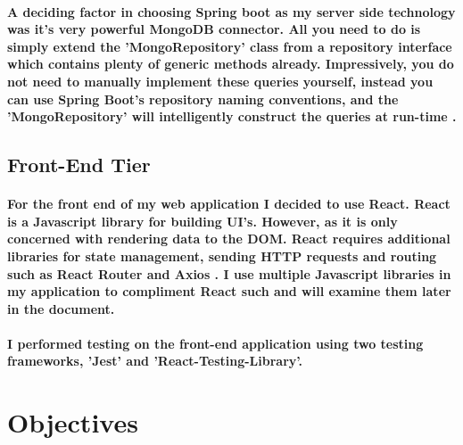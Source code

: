 \paragraph{A deciding factor in choosing Spring boot as my server side technology was it's very powerful MongoDB connector. All you need to do is simply extend the 'MongoRepository' class from a repository interface which contains plenty of generic methods already. Impressively, you do not need to manually implement these queries yourself, instead you can use Spring Boot's repository naming conventions, and the 'MongoRepository' will intelligently construct the queries at run-time \cite{marchioni2015mongodb}.}

\subsection{Front-End Tier}
\paragraph{For the front end of my web application I decided to use React. React is a Javascript library for building UI's. However, as it is only concerned with rendering data to the DOM. React requires  additional libraries for state management, sending HTTP requests and routing such as React Router and Axios \cite{wiki:xxx}. I use multiple Javascript libraries in my application to compliment React such and will examine them later in the document.}
\paragraph{I performed testing on the front-end application using two testing frameworks, 'Jest' and 'React-Testing-Library'.}

\section{Objectives}
